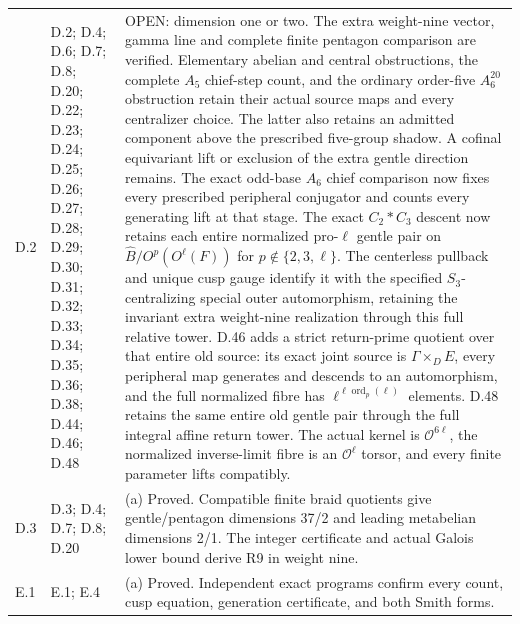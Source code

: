 \begin{longtable}{@{}p{1.1cm}p{3.0cm}p{10.3cm}@{}}
D.2 & D.2; D.4; D.6; D.7; D.8; D.20; D.22; D.23; D.24; D.25; D.26; D.27; D.28; D.29; D.30; D.31; D.32; D.33; D.34; D.35; D.36; D.38; D.44; D.46; D.48 & OPEN: dimension one or two. The extra weight-nine vector, gamma line and complete finite pentagon comparison are verified. Elementary abelian and central obstructions, the complete $A_5$ chief-step count, and the ordinary order-five $A_6^{20}$ obstruction retain their actual source maps and every centralizer choice. The latter also retains an admitted component above the prescribed five-group shadow. A cofinal equivariant lift or exclusion of the extra gentle direction remains. The exact odd-base $A_6$ chief comparison now fixes every prescribed peripheral conjugator and counts every generating lift at that stage. The exact $C_2*C_3$ descent now retains each entire normalized pro-$\ell$ gentle pair on $\widehat B/O^p(O^\ell(F))$ for $p\notin\{2,3,\ell\}$. The centerless pullback and unique cusp gauge identify it with the specified $S_3$-centralizing special outer automorphism, retaining the invariant extra weight-nine realization through this full relative tower. D.46 adds a strict return-prime quotient over that entire old source: its exact joint source is $\Gamma\times_D E$, every peripheral map generates and descends to an automorphism, and the full normalized fibre has $\ell^{\ell\operatorname{ord}_p(\ell)}$ elements. D.48 retains the same entire old gentle pair through the full integral affine return tower. The actual kernel is $\mathcal O^{6\ell}$, the normalized inverse-limit fibre is an $\mathcal O^\ell$ torsor, and every finite parameter lifts compatibly. \\
D.3 & D.3; D.4; D.7; D.8; D.20 & (a) Proved. Compatible finite braid quotients give gentle/pentagon dimensions 37/2 and leading metabelian dimensions 2/1. The integer certificate and actual Galois lower bound derive R9 in weight nine. \\
E.1 & E.1; E.4 & (a) Proved. Independent exact programs confirm every count, cusp equation, generation certificate, and both Smith forms. \\

\end{longtable}
